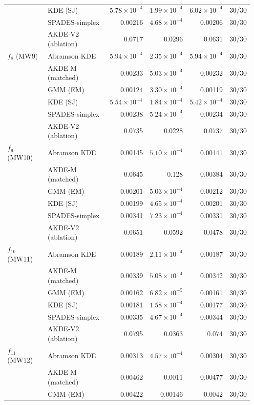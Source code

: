 \begin{tabular}{llrrrr}
 & KDE (SJ) & $5.78\times10^{-4}$ & $1.99\times10^{-4}$ & $6.02\times10^{-4}$ & 30/30 \\
 & SPADES-simplex & 0.00216 & $4.68\times10^{-4}$ & 0.00206 & 30/30 \\
 & AKDE-V2 (ablation) & 0.0717 & 0.0296 & 0.0631 & 30/30 \\
$f_{8}$ (MW9) & Abramson KDE & $5.94\times10^{-4}$ & $2.35\times10^{-4}$ & $5.94\times10^{-4}$ & 30/30 \\
 & AKDE-M (matched) & 0.00233 & $5.03\times10^{-4}$ & 0.00232 & 30/30 \\
 & GMM (EM) & 0.00124 & $3.30\times10^{-4}$ & 0.00119 & 30/30 \\
 & KDE (SJ) & $5.54\times10^{-4}$ & $1.84\times10^{-4}$ & $5.42\times10^{-4}$ & 30/30 \\
 & SPADES-simplex & 0.00238 & $5.24\times10^{-4}$ & 0.00234 & 30/30 \\
 & AKDE-V2 (ablation) & 0.0735 & 0.0228 & 0.0737 & 30/30 \\
$f_{9}$ (MW10) & Abramson KDE & 0.00145 & $5.10\times10^{-4}$ & 0.00141 & 30/30 \\
 & AKDE-M (matched) & 0.0645 & 0.128 & 0.00384 & 30/30 \\
 & GMM (EM) & 0.00201 & $5.03\times10^{-4}$ & 0.00212 & 30/30 \\
 & KDE (SJ) & 0.00199 & $4.65\times10^{-4}$ & 0.00201 & 30/30 \\
 & SPADES-simplex & 0.00341 & $7.23\times10^{-4}$ & 0.00331 & 30/30 \\
 & AKDE-V2 (ablation) & 0.0651 & 0.0592 & 0.0478 & 30/30 \\
$f_{10}$ (MW11) & Abramson KDE & 0.00189 & $2.11\times10^{-4}$ & 0.00187 & 30/30 \\
 & AKDE-M (matched) & 0.00339 & $5.08\times10^{-4}$ & 0.00342 & 30/30 \\
 & GMM (EM) & 0.00162 & $6.82\times10^{-5}$ & 0.00161 & 30/30 \\
 & KDE (SJ) & 0.00181 & $1.58\times10^{-4}$ & 0.00177 & 30/30 \\
 & SPADES-simplex & 0.00335 & $4.67\times10^{-4}$ & 0.00344 & 30/30 \\
 & AKDE-V2 (ablation) & 0.0795 & 0.0363 & 0.074 & 30/30 \\
$f_{11}$ (MW12) & Abramson KDE & 0.00313 & $4.57\times10^{-4}$ & 0.00304 & 30/30 \\
 & AKDE-M (matched) & 0.00462 & 0.0011 & 0.00477 & 30/30 \\
 & GMM (EM) & 0.00422 & 0.00146 & 0.0042 & 30/30 \\

\end{tabular}
